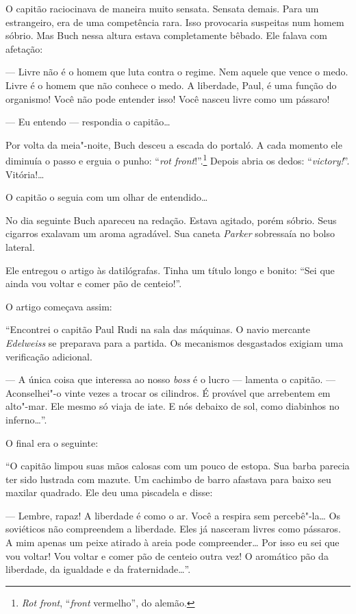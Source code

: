 O capitão raciocinava de maneira muito sensata. Sensata demais. Para um
estrangeiro, era de uma competência rara. Isso provocaria suspeitas num
homem sóbrio. Mas Buch nessa altura estava completamente bêbado. Ele
falava com afetação:

--- Livre não é o homem que luta contra o regime. Nem aquele que vence o
medo. Livre é o homem que não conhece o medo. A liberdade, Paul, é uma
função do organismo! Você não pode entender isso! Você nasceu livre como
um pássaro!

--- Eu entendo --- respondia o capitão\ldots{}

Por volta da meia"-noite, Buch desceu a escada do portaló. A cada momento
ele diminuía o passo e erguia o punho: ``\emph{rot front}!''.\footnote{\emph{Rot
  front}, ``\emph{front} vermelho'', do alemão.} Depois abria os
dedos: ``\emph{victory!}''. Vitória!\ldots{}

O capitão o seguia com um olhar de entendido\ldots{}

No dia seguinte Buch apareceu na redação. Estava agitado, porém sóbrio.
Seus cigarros exalavam um aroma agradável. Sua caneta \emph{Parker}
sobressaía no bolso lateral.

Ele entregou o artigo às datilógrafas. Tinha um título longo e bonito:
``Sei que ainda vou voltar e comer pão de centeio!''.

O artigo começava assim:

``Encontrei o capitão Paul Rudi na sala das máquinas. O navio mercante
\emph{Edelweiss} se preparava para a partida. Os mecanismos desgastados
exigiam uma verificação adicional.

--- A única coisa que interessa ao nosso \emph{boss} é o lucro ---
lamenta o capitão. --- Aconselhei"-o vinte vezes a trocar os cilindros. É
provável que arrebentem em alto"-mar. Ele mesmo só viaja de iate. E nós
debaixo de sol, como diabinhos no inferno\ldots{}''.

O final era o seguinte:

``O capitão limpou suas mãos calosas com um pouco de estopa. Sua barba
parecia ter sido lustrada com mazute. Um cachimbo de barro afastava para baixo seu
maxilar quadrado. Ele deu uma piscadela e disse:

--- Lembre, rapaz! A liberdade é como o ar. Você a respira sem
percebê"-la\ldots{} Os soviéticos não compreendem a liberdade. Eles já
nasceram livres como pássaros. A mim apenas um peixe atirado à areia
pode compreender\ldots{} Por isso eu sei que vou voltar! Vou voltar e comer
pão de centeio outra vez! O aromático pão da liberdade, da igualdade e
da fraternidade\ldots{}''.

